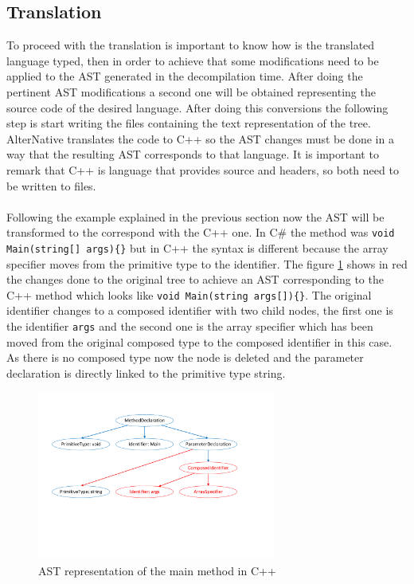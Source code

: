 \subsection{Translation}\label{SS:AN-Process-Translation}
To proceed with the translation is important to know how is the translated language typed, then in order to achieve that some modifications need to be applied to the AST generated in the decompilation time. After doing the pertinent AST modifications a second one will be obtained representing the source code of the desired language. After doing this conversions the following step is start writing the files containing the text representation of the tree. AlterNative translates the code to C++ so the AST changes must be done in a way that the resulting AST corresponds to that language. It is important to remark that C++ is  language that provides source and headers, so both need to be written to files.
\\
\\
Following the example explained in the previous section now the AST will be transformed to the correspond with the C++ one. In C\# the method was \verb!void Main(string[] args){}! but in C++ the syntax is different because the array specifier moves from the primitive type to the identifier. The figure \ref{fig:AN-AST-Conversions} shows in red the changes done to the original tree to achieve an AST corresponding to the C++ method which looks like \verb!void Main(string args[]){}!. The original identifier changes to a composed identifier with two child nodes, the first one is the identifier \verb!args! and the second one is the array specifier which has been moved from the original composed type to the composed identifier in this case. As there is no composed type now the node is deleted and the parameter declaration is directly linked to the primitive type string.
\begin{figure}[H]\begin{center}
 \centering
  \captionsetup{justification=centering}
  \includegraphics[width=0.7\textwidth]{pictures/alternative/ast_conversions_cpp}
  \caption{AST representation of the main method in C++\label{fig:AN-AST-Conversions}}
\end{center}\end{figure}

